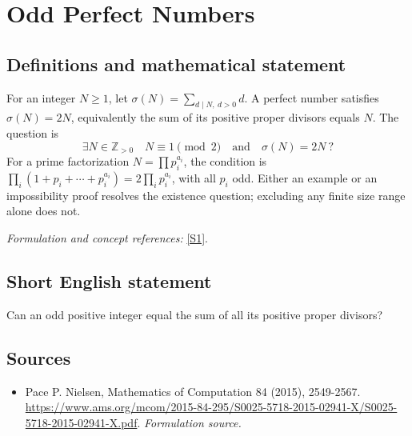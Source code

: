 \documentclass[11pt]{article}
\begin{document}
\section*{\texorpdfstring{Odd Perfect Numbers}{Odd Perfect Numbers}}\label{8}
\subsection{Definitions and mathematical statement}
For an integer $N\ge1$, let $\sigma(N)=\sum_{d\mid N,\ d>0}d$. A perfect number satisfies $\sigma(N)=2N$, equivalently the sum of its positive proper divisors equals $N$. The question is
\[
 \exists N\in{\mathbb{Z}}_{>0}\quad N\equiv1\pmod2\quad\text{and}\quad\sigma(N)=2N\ ?
\]
For a prime factorization $N=\prod p_i^{a_i}$, the condition is
$\prod_i(1+p_i+\cdots+p_i^{a_i})=2\prod_i p_i^{a_i}$, with all $p_i$ odd. Either an example or an impossibility proof resolves the existence question; excluding any finite size range alone does not.
\par\smallskip\textit{Formulation and concept references:} \href{https://www.ams.org/mcom/2015-84-295/S0025-5718-2015-02941-X/S0025-5718-2015-02941-X.pdf}{[S1]}.

\subsection{Short English statement}
Can an odd positive integer equal the sum of all its positive proper divisors?
\subsection{Sources}
\begin{itemize}
\item[S1]Pace P. Nielsen, Mathematics of Computation 84 (2015), 2549-2567.
\url{https://www.ams.org/mcom/2015-84-295/S0025-5718-2015-02941-X/S0025-5718-2015-02941-X.pdf}.
\textit{Formulation source.}
\end{itemize}
\end{document}

